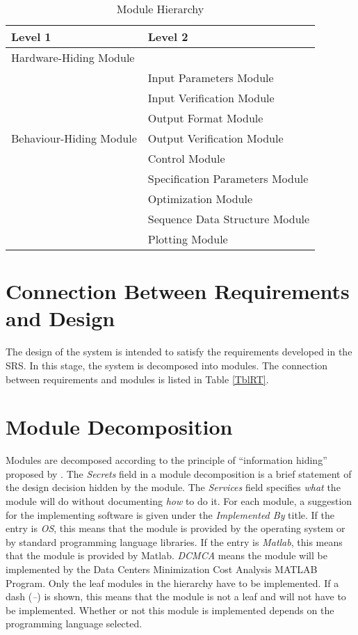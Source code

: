 \documentclass[12pt]{article}
\begin{document}
\begin{table}[h!]
\centering
\begin{tabular}{p{} p{}}
\toprule
\textbf{Level 1} & \textbf{Level 2}\\
\midrule

{Hardware-Hiding Module} & ~ \\
\midrule

\multirow{7}{0.3\textwidth}{Behaviour-Hiding Module} 
& Input Parameters Module\\
&Input Verification Module\\
& Output Format Module\\
& Output Verification Module\\
& Control Module\\
& Specification Parameters Module\\
\midrule

\multirow{3}{0.3\textwidth}{Software Decision Module} 
 &Optimization Module\\
&Sequence Data Structure Module\\
&Plotting Module\\
\bottomrule

\end{tabular}
\caption{Module Hierarchy}
\label{TblMH}
\end{table}

\section{Connection Between Requirements and Design} \label{SecConnection}

The design of the system is intended to satisfy the requirements developed in
the SRS. In this stage, the system is decomposed into modules. The connection
between requirements and modules is listed in Table \ref{TblRT}.

\section{Module Decomposition} \label{SecMD}

Modules are decomposed according to the principle of ``information hiding''
proposed by \citet{ParnasEtAl1984}. The \emph{Secrets} field in a module
decomposition is a brief statement of the design decision hidden by the
module. The \emph{Services} field specifies \emph{what} the module will do
without documenting \emph{how} to do it. For each module, a suggestion for the
implementing software is given under the \emph{Implemented By} title. If the
entry is \emph{OS}, this means that the module is provided by the operating
system or by standard programming language libraries. If the entry is
\emph{Matlab}, this means that the module is provided by Matlab. \emph{DCMCA} means the module will be implemented
by the Data Centers Minimization Cost Analysis MATLAB Program.
Only the leaf modules in the
hierarchy have to be implemented. If a dash (\emph{--}) is shown, this means
that the module is not a leaf and will not have to be implemented. Whether or
not this module is implemented depends on the programming language
selected.
\end{document}
